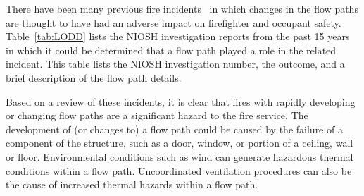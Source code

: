 \documentclass[12pt,oneside]{book}
\begin{document}
There have been many previous fire incidents~\cite{NIOSH:Pettit,NIOSH:Washenitz,NIOSH:Mezzanotte,NIOSH:McFall,NIOSH:McFall2,NIOSH:McFall3,NIOSH:Berardinelli,NIOSH:Koedam,NIOSH:McFall4,NIOSH:Tarley,NIOSH:Braddee,NIOSH:Merinar,NIOSH:Bowyer2,NIOSH:Loflin,NIOSH:Bowyer} in which changes in the flow paths are thought to have had an adverse impact on firefighter and occupant safety. Table~\ref{tab:LODD} lists the NIOSH investigation reports from the past 15 years in which it could be determined that a flow path played a role in the related incident. This table lists the NIOSH investigation number, the outcome, and a brief description of the flow path details.

Based on a review of these incidents, it is clear that fires with rapidly developing or changing flow paths are a significant hazard to the fire service. The development of (or changes to) a flow path could be caused by the failure of a component of the structure, such as a door, window, or portion of a ceiling, wall or floor. Environmental conditions such as wind can generate hazardous thermal conditions within a flow path. Uncoordinated ventilation procedures can also be the cause of increased thermal hazards within a flow path. 
\end{document}
